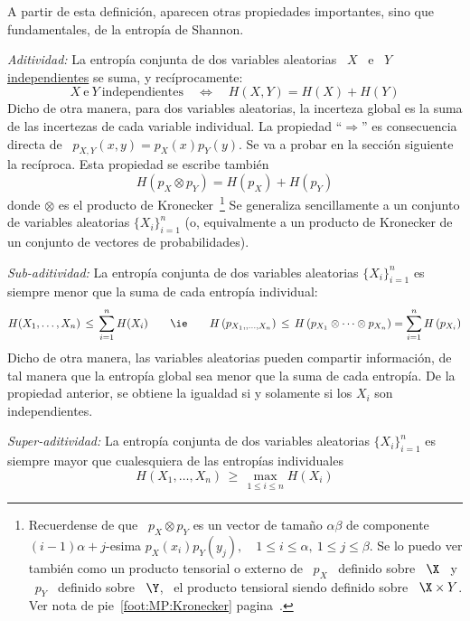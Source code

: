 A partir de esta definici\'on,  aparecen otras propiedades importantes, sino que
fundamentales, de la entrop\'ia de Shannon.
%
\begin{propiedades}
\item\label{prop:SZ:aditividad} {\it Aditividad:}  La entrop\'ia conjunta de dos
  variables aleatorias  \ $X$  \ e \  $Y$ \underline{independientes} se  suma, y
  rec\'iprocamente:
  \[
  X \: \mbox{e} \: Y \: \mbox{independientes} \quad \Leftrightarrow \quad H(X,Y)
  =  H(X) +  H(Y)
  \]
  Dicho de otra manera, para dos variables aleatorias, la incerteza global es la
  suma   de  las  incertezas   de  cada   variable  individual.    La  propiedad
  ``$\Rightarrow$'' es consecuencia directa de \ $p_{X,Y}(x,y) = p_X(x) p_Y(y)$.
  Se va  a probar en  la secci\'on siguiente  la rec\'iproca. Esta  propiedad se
  escribe tambi\'en
  \[
  H\left( p_X \otimes p_Y \right) = H\left( p_X \right) + H\left( p_Y \right)
  \]
  donde  $\otimes$ es el  producto de  Kronecker~\footnote{Recuerdense de  que \
    $p_X  \otimes p_Y$ es  un vector  de tama\~no  $\alpha \beta$  de componente
    $(i-1) \alpha + j$-esima $p_X(x_i) p_Y(y_j),  \quad 1 \le i \le \alpha, \: 1
    \le j  \le \beta$.  Se lo puedo  ver tambi\'en como un  producto tensorial o
    externo de \  $p_X$ \ definido sobre \  $\X$ \ y \ $p_Y$ \  definido sobre \
    $\Y$, \  el producto tensioral siendo  definido sobre \ $\X  \times Y$.  Ver
    nota de pie~\ref{foot:MP:Kronecker} pagina~\pageref{foot:MP:Kronecker}.}  Se
  generaliza  sencillamente  a  un  conjunto  de variables  aleatorias  $\{  X_i
  \}_{i=1}^n$  (o, equivalmente a  un producto  de Kronecker  de un  conjunto de
  vectores de probabilidades).
%
\item\label{prop:SZ:subaditividad} {\it  Sub-aditividad:} La entrop\'ia conjunta
  de dos variables  aleatorias $\{ X_i \}_{i=1}^n$ es siempre  menor que la suma
  de cada entrop\'ia individual:
  \[
  H(X_1,\ldots,X_n)  \,  \le \,  \sum_{i=1}^n  H(X_i)  \qquad \mbox{\ie}  \qquad
  H\left(  p_{X_1,, \ldots  , X_n}  \right) \,  \le \,  H\left(  p_{X_1} \otimes
    \cdots \otimes p_{X_n} \right) = \sum_{i=1}^n H\left( p_{X_i} \right)
  \]
  Dicho de otra manera, las variables aleatorias pueden compartir informaci\'on,
  de  tal  manera que  la  entrop\'ia  global sea  menor  que  la  suma de  cada
  entrop\'ia.  De la  propiedad anterior, se obtiene la  igualdad si y solamente
  si los $X_i$ son independientes.
%
\item\label{prop:SZ:superaditividad}   {\it  Super-aditividad:}   La  entrop\'ia
  conjunta de dos variables aleatorias  $\{ X_i \}_{i=1}^n$ es siempre mayor que
  cualesquiera de las entrop\'ias individuales
  \[
  H(X_1,\ldots,X_n) \, \ge \, \max_{1 \le i \le n} H(X_i)
  \]
\end{propiedades}

